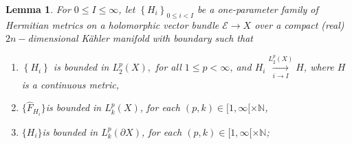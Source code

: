 \documentclass{article}
\newtheorem{lemma}[theorem]{Lemma}
\begin{document}
\begin{lemma}        \label{Lemma smoothness of limit}
For $0\leq I\leq \infty$, let $\left\{ H_{i}\right\}_{0\leq i< I} $ be a
one-parameter family of Hermitian metrics on a holomorphic vector bundle $\mathcal{E}\rightarrow X$ over a compact (real) $2n-$dimensional K\"{a}hler manifold with boundary
such that
\begin{enumerate}
        \item
        $\left\{ H_{i}\right\} $ is bounded in $L_{2}^{p}\left( X\right), $ for all $1\leq p<\infty $, and $\displaystyle H_{i}\underset{i\rightarrow I}{\overset{L_{2}^{p}(X)}{\longrightarrow }}H$, where $H$ is a continuous metric,        
        \item
        $\{\hat{F}_{H_{i}}\}$is bounded in $L_{k}^{p}\left( X\right) $, for each $(p,k)\in [1,\infty[\times\mathbb{N}$, 
        \item
        $\{H_{i}\}$is bounded in $L_{k}^{p}\left( \partial X\right) $, for each $(p,k)\in [1,\infty[\times\mathbb{N}$; 
        

\end{enumerate}
\end{lemma}
\end{document}
